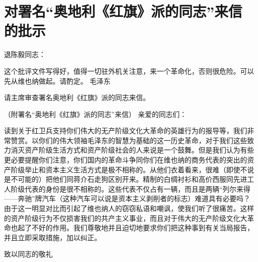 \section[对署名“奥地利《红旗》派的同志”来信的批示（一九六六年九月九日）]{对署名“奥地利《红旗》派的同志”来信的批示}


退陈毅同志：

这个批评文件写得好，值得一切驻外机关注意，来一个革命化，否则很危险。可以先从维也纳做起。请酌定。
毛泽东

请主席审查署名奥地利《红旗》派的同志来信。


（附署名“奥地利《红旗》派的同志”来信）
亲爱的同志们：

读到关于红卫兵支持你们伟大的无产阶级文化大革命的英雄行为的报导等，我们非常赞赏。以你们的伟大领袖毛泽东的智慧为基础的这一历史革命，对于我们这些致力消灭资产阶级生活方式和资产阶级社会的人来说是一个鼓舞。但是我们认为有些更必要提醒你们注意，你们国内的革命斗争同你们在维也纳的商务代表的突出的资产阶级举止和资本主义生活方式是极不相称的。从他们衣着看来，很难（即使不说是不可能的）把他们同蒋介石走狗区别开来。精制的白绸衬衫和高价西服同先进工人阶级代表的身份是很不相称的。这些代表不仅占有一辆，而且是两辆“列尔来得——奔驰”牌汽车（这种汽车可以说是资本主义剥削者的标志）难道具有必要吗？由于这一明显对比而引起了维也纳人的窃窃私语和嘲讽，使我们听了很痛苦。这样的资产阶级行为不仅损害我们的共产主义事业，而且对于伟大的无产阶级文化大革命也起了不好的作用。我们尊敬地并且迫切地要求你们把这种事到有关当局报告，并且立即采取措施，加以纠正。

致以同志的敬礼



